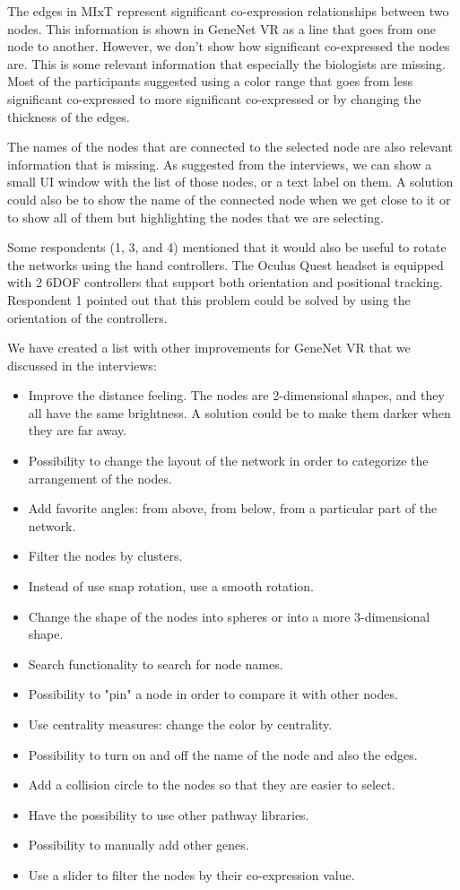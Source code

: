 The edges in MIxT represent significant co-expression relationships between two nodes. This information is shown in GeneNet VR as a line that goes from one node to another. However, we don't show how significant co-expressed the nodes are. This is some relevant information that especially the biologists are missing. Most of the participants suggested using a color range that goes from less significant co-expressed to more significant co-expressed or by changing the thickness of the edges.

The names of the nodes that are connected to the selected node are also relevant information that is missing. As suggested from the interviews, we can show a small UI window with the list of those nodes, or a text label on them. A solution could also be to show the name of the connected node when we get close to it or to show all of them but highlighting the nodes that we are selecting.

Some respondents (1, 3, and 4) mentioned that it would also be useful to rotate the networks using the hand controllers. The Oculus Quest headset is equipped with 2 6DOF controllers that support both orientation and positional tracking. Respondent 1 pointed out that this problem could be solved by using the orientation of the controllers.

We have created a list with other improvements for GeneNet VR that we discussed in the interviews:
\begin{itemize}
  \item Improve the distance feeling. The nodes are 2-dimensional shapes, and they all have the same brightness. A solution could be to make them darker when they are far away.
  \item Possibility to change the layout of the network in order to categorize the arrangement of the nodes.
  \item Add favorite angles: from above, from below, from a particular part of the network.
  \item Filter the nodes by clusters.
  \item Instead of use snap rotation, use a smooth rotation.
  \item Change the shape of the nodes into spheres or into a more 3-dimensional shape.
  \item Search functionality to search for node names.
  \item Possibility to "pin" a node in order to compare it with other nodes.
  \item Use centrality measures: change the color by centrality.
  \item Possibility to turn on and off the name of the node and also the edges.
  \item Add a collision circle to the nodes so that they are easier to select.
  \item Have the possibility to use other pathway libraries.
  \item Possibility to manually add other genes.
  \item Use a slider to filter the nodes by their co-expression value.
\end{itemize}

